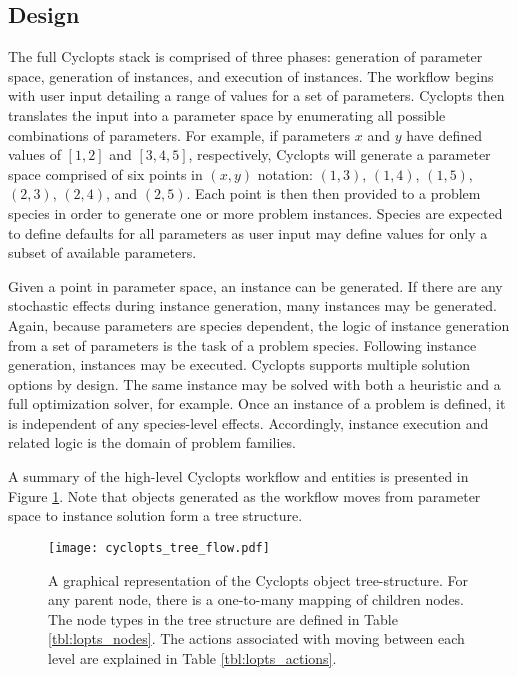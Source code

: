 \subsection{Design}\label{method:tools:struc}

The full Cyclopts stack is comprised of three phases: generation of parameter
space, generation of instances, and execution of instances. The workflow begins
with user input detailing a range of values for a set of parameters. Cyclopts
then translates the input into a parameter space by enumerating all possible
combinations of parameters. For example, if parameters $x$ and $y$ have defined
values of $[1, 2]$ and $[3, 4, 5]$, respectively, Cyclopts will generate a
parameter space comprised of six points in $(x, y)$ notation: $(1, 3)$, $(1,
4)$, $(1, 5)$, $(2, 3)$, $(2, 4)$, and $(2, 5)$. Each point is then then
provided to a problem species in order to generate one or more problem
instances. Species are expected to define defaults for all parameters as user
input may define values for only a subset of available parameters.

Given a point in parameter space, an instance can be generated. If there are any
stochastic effects during instance generation, many instances may be
generated. Again, because parameters are species dependent, the logic of
instance generation from a set of parameters is the task of a problem
species. Following instance generation, instances may be executed. Cyclopts
supports multiple solution options by design. The same instance may be solved
with both a heuristic and a full optimization solver, for example. Once an
instance of a problem is defined, it is independent of any species-level
effects. Accordingly, instance execution and related logic is the domain of
problem families. 

A summary of the high-level Cyclopts workflow and entities is presented in
Figure \ref{fig:lopts_desgin}. Note that objects generated as the workflow moves
from parameter space to instance solution form a tree structure.

\begin{figure}
  \begin{center}
    \texttt{[image: cyclopts\_tree\_flow.pdf]}
    \caption[]{
      \label{fig:lopts_desgin}
      A graphical representation of the Cyclopts object tree-structure. For any
      parent node, there is a one-to-many mapping of children nodes. The node
      types in the tree structure are defined in Table
      \ref{tbl:lopts_nodes}. The actions associated with moving between each
      level are explained in Table \ref{tbl:lopts_actions}.}
  \end{center}
\end{figure}

